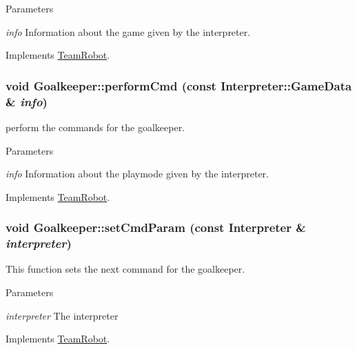 \begin{DoxyParams}{Parameters}
\item[{\em info}]Information about the game given by the interpreter. \end{DoxyParams}


Implements \hyperlink{classTeamRobot_a71ec65db46db1ac511fe17b668d4f192}{TeamRobot}.

\hypertarget{classGoalkeeper_ab850d0d2278730bebc5479f1a339a925}{
\subsubsection[{performCmd}]{\setlength{\rightskip}{0pt plus 5cm}void Goalkeeper::performCmd (const {\bf Interpreter::GameData} \& {\em info})}}
\label{classGoalkeeper_ab850d0d2278730bebc5479f1a339a925}


perform the commands for the goalkeeper. 


\begin{DoxyParams}{Parameters}
\item[{\em info}]Information about the playmode given by the interpreter. \end{DoxyParams}


Implements \hyperlink{classTeamRobot_a9b84df51ca16a7203fdb6498ea6741da}{TeamRobot}.

\hypertarget{classGoalkeeper_acfa6fbad0f6b1627fd59cc7cce6ff321}{
\subsubsection[{setCmdParam}]{\setlength{\rightskip}{0pt plus 5cm}void Goalkeeper::setCmdParam (const {\bf Interpreter} \& {\em interpreter})}}
\label{classGoalkeeper_acfa6fbad0f6b1627fd59cc7cce6ff321}


This function sets the next command for the goalkeeper. 


\begin{DoxyParams}{Parameters}
\item[{\em interpreter}]The interpreter \end{DoxyParams}


Implements \hyperlink{classTeamRobot_a34c0fd6986c510d4025e5752b3c0e49a}{TeamRobot}.

